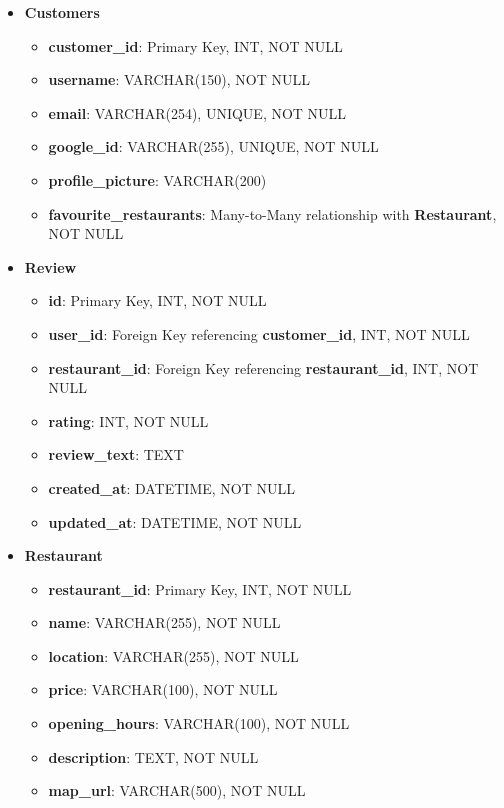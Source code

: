 \documentclass[12pt, a4paper, oneside]{article}
\begin{document}
\begin{itemize}
    \item \textbf{Customers}
    \begin{itemize}
        \item \textbf{customer\_id}: Primary Key, INT, NOT NULL
        \item \textbf{username}: VARCHAR(150), NOT NULL
        \item \textbf{email}: VARCHAR(254), UNIQUE, NOT NULL
        \item \textbf{google\_id}: VARCHAR(255), UNIQUE, NOT NULL
        \item \textbf{profile\_picture}: VARCHAR(200)
        \item \textbf{favourite\_restaurants}: Many-to-Many relationship with \textbf{Restaurant}, NOT NULL
    \end{itemize}

    \item \textbf{Review}
    \begin{itemize}
        \item \textbf{id}: Primary Key, INT, NOT NULL
        \item \textbf{user\_id}: Foreign Key referencing \textbf{customer\_id}, INT, NOT NULL
        \item \textbf{restaurant\_id}: Foreign Key referencing \textbf{restaurant\_id}, INT, NOT NULL
        \item \textbf{rating}: INT, NOT NULL
        \item \textbf{review\_text}: TEXT
        \item \textbf{created\_at}: DATETIME, NOT NULL
        \item \textbf{updated\_at}: DATETIME, NOT NULL
    \end{itemize}

    \item \textbf{Restaurant}
    \begin{itemize}
        \item \textbf{restaurant\_id}: Primary Key, INT, NOT NULL
        \item \textbf{name}: VARCHAR(255), NOT NULL
        \item \textbf{location}: VARCHAR(255), NOT NULL
        \item \textbf{price}: VARCHAR(100), NOT NULL
        \item \textbf{opening\_hours}: VARCHAR(100), NOT NULL
        \item \textbf{description}: TEXT, NOT NULL
        \item \textbf{map\_url}: VARCHAR(500), NOT NULL
    \end{itemize}


\end{itemize}
\end{document}
